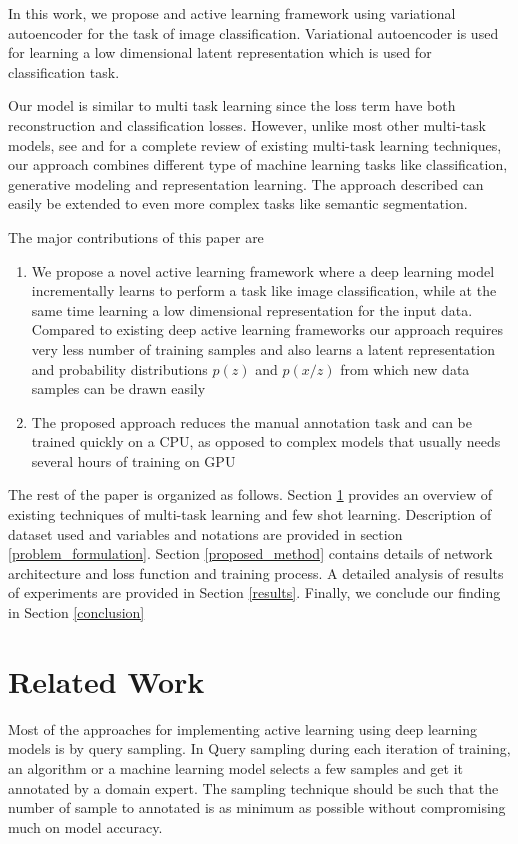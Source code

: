 \documentclass{uai2021} %
\begin{document}
In this work, we propose and active learning framework using variational autoencoder for the task of  image classification.
Variational autoencoder is used for learning a low dimensional latent representation which is used for classification task.


Our model is similar to multi task learning since the loss term have both reconstruction and classification losses.
However, unlike most other multi-task models, see \cite{ruder2017overview} and \cite{crawshaw2020multi} for a complete review of existing multi-task learning techniques, our approach combines  different type of machine learning tasks like classification, generative modeling and representation learning.
The approach described can easily be extended to even more complex tasks like semantic segmentation.

The major contributions of this paper are
\begin{enumerate}
    \item We propose a novel active learning framework where a  deep learning model incrementally learns to perform a task like image classification, while at the same time learning a low dimensional representation for the input data.
          Compared to existing deep active learning frameworks our approach requires very less number of training samples and also learns a latent representation and  probability distributions $p(z)$ and $p(x/z)$ from which new data samples can be drawn easily
    \item The proposed approach reduces the manual annotation task and can be trained quickly on a CPU, as opposed to complex models that usually needs several hours of training on GPU
\end{enumerate}

The rest of the paper is organized as follows.
Section \ref{related_works} provides an overview of existing techniques of multi-task learning and few shot learning.
Description of dataset used and variables and notations are provided in section \ref{problem_formulation}.
Section \ref{proposed_method} contains details of network architecture and loss function and training process.
A detailed analysis of results of experiments are provided in Section \ref{results}.
Finally, we conclude our finding in Section \ref{conclusion}

\section{Related Work} \label{related_works}
Most of the approaches for implementing active learning using deep learning models is by query sampling.
In Query sampling during each iteration of training, an algorithm or a machine learning model selects a few samples and get it annotated by a domain expert\cite{sinha2019variational}\cite{sener2017active}.
The sampling technique should be such that the number of sample to annotated is as minimum as possible without compromising much on model accuracy.
\end{document}
